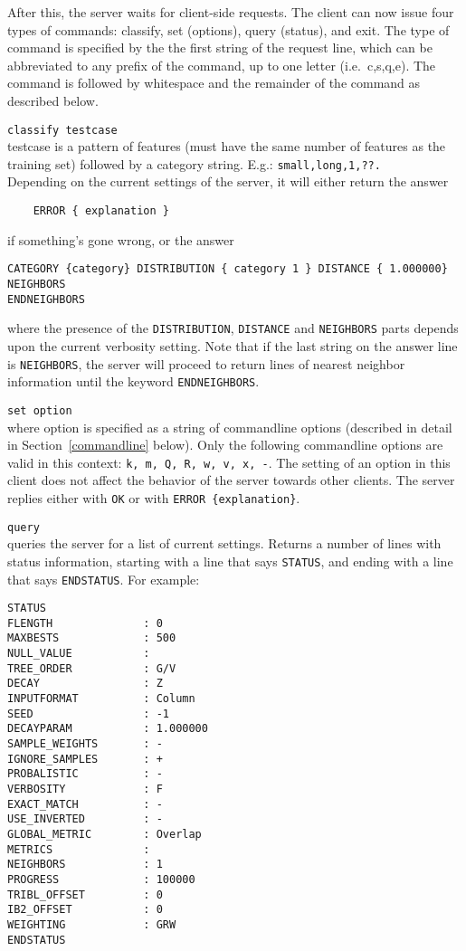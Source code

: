 \documentclass{report}
\begin{document}
After this, the server waits for client-side requests.
The client can now issue four types of commands: classify, set
(options), query (status), and exit. The type of command is specified
by the the first string of the request line, which can be abbreviated
to any prefix of the command, up to one letter (i.e.~c,s,q,e). The
command is followed by whitespace and the remainder of the command as
described below.
\begin{description}
\item {\tt classify testcase}\\
      testcase is a pattern of features (must have the same number of
      features as the training set) followed by a category
      string. E.g.: {\tt small,long,1,??.}\\
      Depending on the current settings of the server, it will either
      return the answer 
      \begin{verbatim}
	ERROR { explanation }
      \end{verbatim}
      if something's gone wrong, or the answer
      \begin{verbatim}
CATEGORY {category} DISTRIBUTION { category 1 } DISTANCE { 1.000000} NEIGHBORS
ENDNEIGHBORS
      \end{verbatim}
      where the presence of the {\tt DISTRIBUTION}, {\tt DISTANCE} and {\tt NEIGHBORS}
parts depends upon the current verbosity setting. Note that if the
last string on the answer line is {\tt NEIGHBORS}, the server will
proceed to return lines of nearest neighbor information until the
keyword {\tt ENDNEIGHBORS}.
\item {\tt set option}\\
      where option is specified as a string of commandline options
(described in detail in Section~\ref{commandline} below). Only the
following commandline options are valid in this context: {\tt k, m, Q,
R, w, v, x, -}. The
setting of an option in this client 
does not affect the behavior of the server
towards other clients. The server replies either with {\tt OK} or with
{\tt ERROR \{explanation\}}. 
\item {\tt query}\\
      queries the server for a list of current settings. Returns a
number of lines with status information, starting with a line that
says {\tt STATUS}, and ending with a line that says {\tt ENDSTATUS}. For example:

\begin{footnotesize}
\begin{verbatim}
STATUS
FLENGTH              : 0
MAXBESTS             : 500
NULL_VALUE           : 
TREE_ORDER           : G/V
DECAY                : Z
INPUTFORMAT          : Column
SEED                 : -1
DECAYPARAM           : 1.000000
SAMPLE_WEIGHTS       : -
IGNORE_SAMPLES       : +
PROBALISTIC          : -
VERBOSITY            : F
EXACT_MATCH          : -
USE_INVERTED         : -
GLOBAL_METRIC        : Overlap
METRICS              : 
NEIGHBORS            : 1
PROGRESS             : 100000
TRIBL_OFFSET         : 0
IB2_OFFSET           : 0
WEIGHTING            : GRW
ENDSTATUS
\end{verbatim}
\end{footnotesize}


\end{description}
\end{document}
